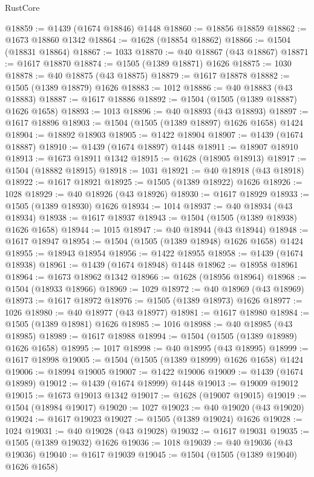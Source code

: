 \begin{lexlean}{RustCore}
\begin{coremodule}
@18859 := @1439 (@1674 @18846) @1448
@18860 := @18856 @18859
@18862 := @1673 @18860 @1342
@18864 := @1628 (@18854 @18862)
@18866 := @1504 (@18831 @18864)
@18867 := 1033
@18870 := @40 @18867 (@43 @18867)
@18871 := @1617 @18870
@18874 := @1505 (@1389 @18871) @1626
@18875 := 1030
@18878 := @40 @18875 (@43 @18875)
@18879 := @1617 @18878
@18882 := @1505 (@1389 @18879) @1626
@18883 := 1012
@18886 := @40 @18883 (@43 @18883)
@18887 := @1617 @18886
@18892 := @1504 (@1505 (@1389 @18887) @1626 @1658)
@18893 := 1013
@18896 := @40 @18893 (@43 @18893)
@18897 := @1617 @18896
@18903 := @1504 (@1505 (@1389 @18897) @1626 @1658) @1424
@18904 := @18892 @18903
@18905 := @1422 @18904
@18907 := @1439 (@1674 @18887)
@18910 := @1439 (@1674 @18897) @1448
@18911 := @18907 @18910
@18913 := @1673 @18911 @1342
@18915 := @1628 (@18905 @18913)
@18917 := @1504 (@18882 @18915)
@18918 := 1031
@18921 := @40 @18918 (@43 @18918)
@18922 := @1617 @18921
@18925 := @1505 (@1389 @18922) @1626
@18926 := 1028
@18929 := @40 @18926 (@43 @18926)
@18930 := @1617 @18929
@18933 := @1505 (@1389 @18930) @1626
@18934 := 1014
@18937 := @40 @18934 (@43 @18934)
@18938 := @1617 @18937
@18943 := @1504 (@1505 (@1389 @18938) @1626 @1658)
@18944 := 1015
@18947 := @40 @18944 (@43 @18944)
@18948 := @1617 @18947
@18954 := @1504 (@1505 (@1389 @18948) @1626 @1658) @1424
@18955 := @18943 @18954
@18956 := @1422 @18955
@18958 := @1439 (@1674 @18938)
@18961 := @1439 (@1674 @18948) @1448
@18962 := @18958 @18961
@18964 := @1673 @18962 @1342
@18966 := @1628 (@18956 @18964)
@18968 := @1504 (@18933 @18966)
@18969 := 1029
@18972 := @40 @18969 (@43 @18969)
@18973 := @1617 @18972
@18976 := @1505 (@1389 @18973) @1626
@18977 := 1026
@18980 := @40 @18977 (@43 @18977)
@18981 := @1617 @18980
@18984 := @1505 (@1389 @18981) @1626
@18985 := 1016
@18988 := @40 @18985 (@43 @18985)
@18989 := @1617 @18988
@18994 := @1504 (@1505 (@1389 @18989) @1626 @1658)
@18995 := 1017
@18998 := @40 @18995 (@43 @18995)
@18999 := @1617 @18998
@19005 := @1504 (@1505 (@1389 @18999) @1626 @1658) @1424
@19006 := @18994 @19005
@19007 := @1422 @19006
@19009 := @1439 (@1674 @18989)
@19012 := @1439 (@1674 @18999) @1448
@19013 := @19009 @19012
@19015 := @1673 @19013 @1342
@19017 := @1628 (@19007 @19015)
@19019 := @1504 (@18984 @19017)
@19020 := 1027
@19023 := @40 @19020 (@43 @19020)
@19024 := @1617 @19023
@19027 := @1505 (@1389 @19024) @1626
@19028 := 1024
@19031 := @40 @19028 (@43 @19028)
@19032 := @1617 @19031
@19035 := @1505 (@1389 @19032) @1626
@19036 := 1018
@19039 := @40 @19036 (@43 @19036)
@19040 := @1617 @19039
@19045 := @1504 (@1505 (@1389 @19040) @1626 @1658)

\end{coremodule}
\end{lexlean}
